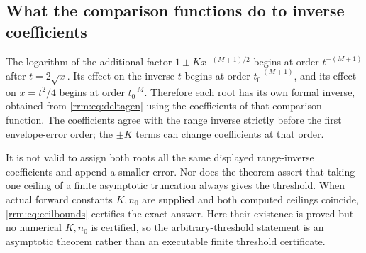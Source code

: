 \documentclass[11pt]{article}
\theoremstyle{remark}\newtheorem{remark}[theorem]{Remark}
\begin{document}
\subsection{What the comparison functions do to inverse coefficients}
The logarithm of the additional factor $1\pm Kx^{-(M+1)/2}$ begins at order $t^{-(M+1)}$ after $t=2\sqrt x$. Its effect on the inverse $t$ begins at order $t_0^{-(M+1)}$, and its effect on $x=t^2/4$ begins at order $t_0^{-M}$. Therefore each root has its own formal inverse, obtained from \eqref{rrm:eq:deltagen} using the coefficients of that comparison function. The coefficients agree with the range inverse strictly before the first envelope-error order; the $\pm K$ terms can change coefficients at that order.

It is not valid to assign both roots all the same displayed range-inverse coefficients and append a smaller error. Nor does the theorem assert that taking one ceiling of a finite asymptotic truncation always gives the threshold. When actual forward constants $K,n_0$ are supplied and both computed ceilings coincide, \eqref{rrm:eq:ceilbounds} certifies the exact answer. Here their existence is proved but no numerical $K,n_0$ is certified, so the arbitrary-threshold statement is an asymptotic theorem rather than an executable finite threshold certificate.
\end{document}
